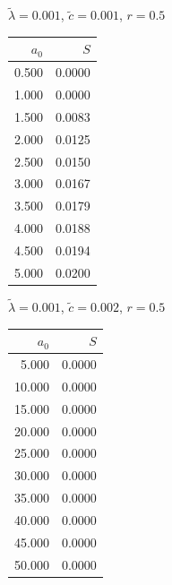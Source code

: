 \documentclass[11pt,a4paper]{article}
\begin{document}
\begin{minipage}[t]{\textwidth}
    \begin{minipage}[t]{0.32\textwidth}
        \footnotesize
        \begin{flushleft}$\tilde{\lambda}=0.001$, $\tilde{c}=0.001$, $r=0.5$\end{flushleft}
        \begin{tabular}[t]{rr}
            $a_0$ & $S$ \\
            \hline
             0.500 & 0.0000 \\
             1.000 & 0.0000 \\
             1.500 & 0.0083 \\
             2.000 & 0.0125 \\
             2.500 & 0.0150 \\
             3.000 & 0.0167 \\
             3.500 & 0.0179 \\
             4.000 & 0.0188 \\
             4.500 & 0.0194 \\
             5.000 & 0.0200 \\
        \end{tabular}
    \end{minipage}
    \begin{minipage}[t]{0.32\textwidth}
        \footnotesize
        \begin{flushleft}$\tilde{\lambda}=0.001$, $\tilde{c}=0.002$, $r=0.5$\end{flushleft}
        \begin{tabular}[t]{rr}
            $a_0$ & $S$ \\
            \hline
             5.000 & 0.0000 \\
            10.000 & 0.0000 \\
            15.000 & 0.0000 \\
            20.000 & 0.0000 \\
            25.000 & 0.0000 \\
            30.000 & 0.0000 \\
            35.000 & 0.0000 \\
            40.000 & 0.0000 \\
            45.000 & 0.0000 \\
            50.000 & 0.0000 \\
        \end{tabular}
    \end{minipage}
    \begin{minipage}[t]{0.32\textwidth}

\end{minipage}
\end{minipage}
\end{document}
